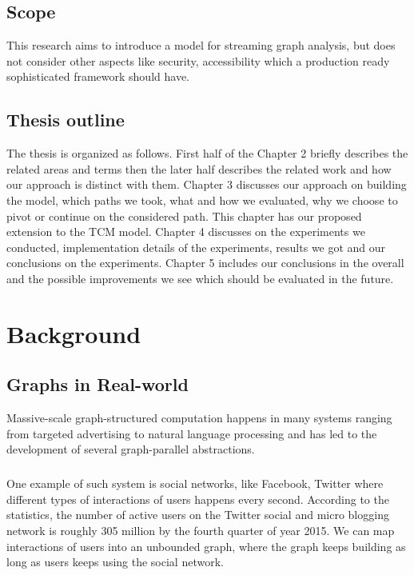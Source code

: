 \documentclass[12pt]{report}
\numberwithin{figure}{section}
\numberwithin{table}{section}
\begin{document}
\section{Scope}
This research aims to introduce a model for streaming graph analysis, but does not consider other aspects like security, accessibility which  a production ready sophisticated framework should have.

\section{Thesis outline}
The thesis is organized as follows. First half of the Chapter 2 briefly describes the related areas and terms then the later half describes the related work and how our approach is distinct with them. Chapter 3 discusses our approach on building the model, which paths we took, what and how we evaluated, why we choose to pivot or continue on the considered path. This chapter has our proposed extension to the TCM model. Chapter 4 discusses on the experiments we conducted, implementation details of the experiments, results we got and our conclusions on the experiments. Chapter 5 includes our conclusions in the overall and the possible improvements we see which should be evaluated in the future.

\chapter{Background}
\section{Graphs in Real-world}
Massive-scale graph-structured computation happens in many systems ranging from targeted advertising to natural language processing and has led to the development of several graph-parallel abstractions. 

\paragraph{}

One example of such system is social networks, like Facebook, Twitter where different types of interactions of users happens every second. According to the statistics, the number of active users on the Twitter social and micro blogging network is roughly 305 million by the fourth quarter of  year 2015\cite{TwitterStats}. We can map interactions of users into an unbounded graph, where the graph keeps building as long as users keeps using the social network.
\end{document}
